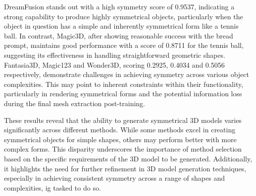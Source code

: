 DreamFusion stands out with a high symmetry score of 0.9537, indicating a strong capability to produce highly symmetrical objects, particularly when the object in question has a simple and inherently symmetrical form like a tennis ball. In contrast, Magic3D, after showing reasonable success with the bread prompt, maintains good performance with a score of 0.8711 for the tennis ball, suggesting its effectiveness in handling straightforward geometric shapes. Fantasia3D, Magic123 and Wonder3D, scoring 0.2925, 0.4034 and 0.5056 respectively, demonstrate challenges in achieving symmetry across various object complexities. This may point to inherent constraints within their functionality, particularly in rendering symmetrical forms and the potential information loss during the final mesh extraction post-training.

These results reveal that the ability to generate symmetrical 3D models varies significantly across different methods. While some methods excel in creating symmetrical objects for simple shapes, others may perform better with more complex forms. This disparity underscores the importance of method selection based on the specific requirements of the 3D model to be generated. Additionally, it highlights the need for further refinement in 3D model generation techniques, especially in achieving consistent symmetry across a range of shapes and complexities, ig tasked to do so.

